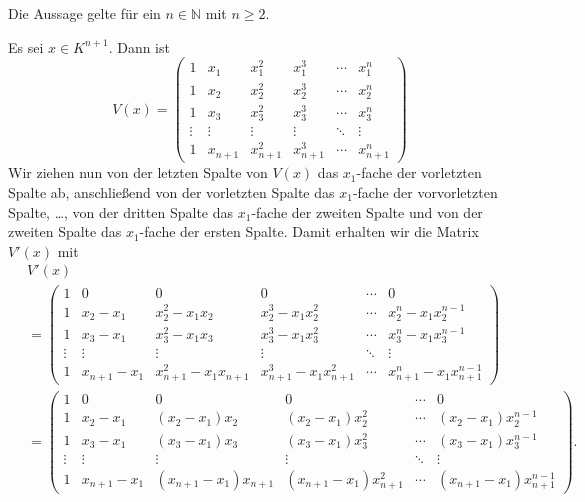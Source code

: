 \documentclass[a4paper,10pt]{article}
\begin{document}
\begin{iv}
 Die Aussage gelte für ein $n \in \mathbb{N}$ mit $n \geq 2$.
\end{iv}

\begin{is}
 Es sei $x \in K^{n+1}$. Dann ist
 \[
  V(x) =
  \begin{pmatrix}
   1      & x_1     & x_1^2     & x_1^3     & \cdots & x_1^n     \\
   1      & x_2     & x_2^2     & x_2^3     & \cdots & x_2^n     \\
   1      & x_3     & x_3^2     & x_3^3     & \cdots & x_3^n     \\
   \vdots & \vdots  & \vdots    & \vdots    & \ddots & \vdots    \\
   1      & x_{n+1} & x_{n+1}^2 & x_{n+1}^3 & \cdots & x_{n+1}^n
  \end{pmatrix}
 \]
 Wir ziehen nun von der letzten Spalte von $V(x)$ das $x_1$-fache der vorletzten Spalte ab, anschließend von der vorletzten Spalte das $x_1$-fache der vorvorletzten Spalte, \dots, von der dritten Spalte das $x_1$-fache der zweiten Spalte und von der zweiten Spalte das $x_1$-fache der ersten Spalte. Damit erhalten wir die Matrix $V'(x)$ mit
 \begin{align*}
  &\, V'(x) \\
  &\,=
  \begin{pmatrix}
   1      & 0           & 0                     & 0                       & \cdots & 0                     \\
   1      & x_2 - x_1   & x_2^2 - x_1 x_2       & x_2^3 - x_1 x_2^2       & \cdots & x_2^n - x_1 x_2^{n-1} \\
   1      & x_3 - x_1   & x_3^2 - x_1 x_3       & x_3^3 - x_1 x_3^2       & \cdots & x_3^n - x_1 x_3^{n-1} \\
   \vdots & \vdots      & \vdots                & \vdots                  & \ddots & \vdots                \\
   1      & x_{n+1}-x_1 & x_{n+1}^2-x_1 x_{n+1} & x_{n+1}^3-x_1 x_{n+1}^2 & \cdots & x_{n+1}^n-x_1 x_{n+1}^{n-1}
  \end{pmatrix} \\
  &\,=
  \begin{pmatrix}
   1      & 0           & 0                    & 0                      & \cdots & 0                     \\
   1      & x_2 - x_1   & (x_2 - x_1)x_2       & (x_2 - x_1)x_2^2       & \cdots & (x_2 - x_1)x_2^{n-1}  \\
   1      & x_3 - x_1   & (x_3 - x_1)x_3       & (x_3 - x_1)x_3^2       & \cdots & (x_3 - x_1)x_3^{n-1}  \\
   \vdots & \vdots      & \vdots               & \vdots                 & \ddots & \vdots                \\
   1      & x_{n+1}-x_1 & (x_{n+1}-x_1)x_{n+1} & (x_{n+1}-x_1)x_{n+1}^2 & \cdots & (x_{n+1}-x_1)x_{n+1}^{n-1}
  \end{pmatrix}.
 \end{align*}
\end{is}
\end{document}
